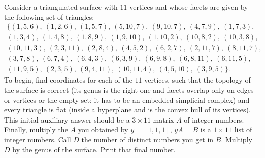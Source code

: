 Consider a triangulated surface with $11$ vertices and whose facets are given by the following set of triangles:
\begin{multline*}
\bigl\{(1,5,6),\ (1,2,6),\ (1,5,7),\ (5,10,7),\ (9,10,7),\ (4,7,9),\ (1,7,3),\\
(1,3,4),\ (1,4,8),\ (1,8,9),\ (1,9,10),\ (1,10,2),\ (10,8,2),\ (10,3,8),\\
(10,11,3),\ (2,3,11),\ (2,8,4),\ (4,5,2),\ (6,2,7),\ (2,11,7),\ (8,11,7),\\
(3,7,8),\ (6,7,4),\ (6,4,3),\ (6,3,9),\ (6,9,8),\ (6,8,11),\ (6,11,5),\\
(11,9,5),\ (2,3,5),\ (9,4,11),\ (10,11,4),\ (4,5,10),\ (3,9,5)\bigr\}.
\end{multline*}
To begin, find coordinates for each of the $11$ vertices, such that the topology of the surface is correct (its genus is the right one and facets overlap only on edges or vertices or the empty set; it has to be an embedded simplicial complex) and every triangle is flat (inside a hyperplane and is the convex hull of its vertices). This initial auxiliary answer should be a $3 \times 11$ matrix $A$ of integer numbers. Finally, multiply the $A$ you obtained by $y=[1,1,1]$, $yA=B$ is a $1 \times 11$ list of integer numbers. Call $D$ the number of distinct numbers you get in $B$. Multiply $D$ by the genus of the surface. Print that final number.
